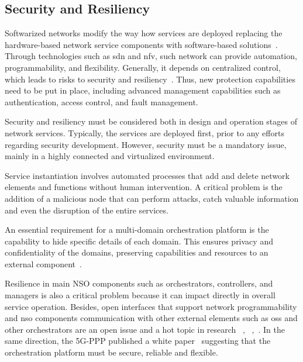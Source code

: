 \subsection{Security and Resiliency}

Softwarized networks modify the way how services are deployed replacing the hardware-based network service components with software-based solutions~\cite{Draxler2017SONATA:Networksb}. Through technologies such as \gls{sdn} and \gls{nfv}, such network can provide automation, programmability, and flexibility. Generally, it depends on centralized control, which leads to risks to security and resiliency~\cite{Arfaoui2017SecurityDirections}. Thus, new protection capabilities need to be put in place, including advanced management capabilities such as authentication, access control, and fault management. 

Security and resiliency must be considered both in design and operation stages of network services. Typically, the services are deployed first, prior to any efforts regarding security development. However, security must be a mandatory issue, mainly in a highly connected and virtualized environment. 

Service instantiation involves automated processes that add and delete network elements and functions without human intervention. A critical problem is the addition of a malicious node that can perform attacks, catch valuable information and even the disruption of the entire services.      

An essential requirement for a multi-domain orchestration platform is the capability to hide specific details of each domain. This ensures privacy and confidentiality of the domains, preserving capabilities and resources to an external component~\cite{francescon2017x}.

Resilience in main NSO components such as orchestrators, controllers, and managers is also a critical problem because it can impact directly in overall service operation. Besides, open interfaces that support network programmability and \gls{nso} components communication with other external elements such as \gls{oss} and other orchestrators are an open issue and a hot topic in research ~\cite{Ordonez-Lucena2017NetworkChallenges}, ~\cite{Arfaoui2017SecurityDirections},~\cite{7345422}. In the same direction, the 5G-PPP published a white paper~\cite{elayoubi:hal-01488208} suggesting that the orchestration platform must be secure, reliable and flexible.